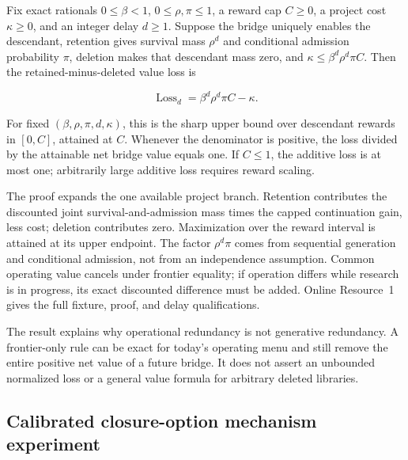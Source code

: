 \begin{theorem}
\label{thm:normalized-frontier-pruning-loss}
Fix exact rationals \(0\le\beta<1\), \(0\le\rho,\pi\le1\), a reward cap
\(C\ge0\), a project cost \(\kappa\ge0\), and an integer delay \(d\ge1\).
Suppose the bridge uniquely enables the descendant, retention gives survival
mass \(\rho^d\) and conditional admission probability \(\pi\), deletion makes
that descendant mass zero, and
\(\kappa\le\beta^d\rho^d\pi C\). Then the retained-minus-deleted value loss is

\begin{equation}
 \operatorname{Loss}_d
 =\beta^d\rho^d\pi C-\kappa.
 \label{eq:normalized-pruning-loss}
\end{equation}

For fixed \((\beta,\rho,\pi,d,\kappa)\), this is the sharp upper bound over
descendant rewards in \([0,C]\), attained at \(C\). Whenever the denominator
is positive, the loss divided by the attainable net bridge value equals one.
If \(C\le1\), the additive loss is at most one; arbitrarily large additive
loss requires reward scaling.
\end{theorem}

The proof expands the one available project branch. Retention contributes
the discounted joint survival-and-admission mass times the capped continuation
gain, less cost; deletion contributes zero. Maximization over the reward
interval is attained at its upper endpoint. The factor
\(\rho^d\pi\) comes from sequential generation and conditional admission, not
from an independence assumption. Common operating value cancels under
frontier equality; if operation differs while research is in progress, its
exact discounted difference must be added. Online Resource~1 gives the full
fixture, proof, and delay qualifications.

The result explains why operational redundancy is not generative redundancy.
A frontier-only rule can be exact for today's operating menu and still remove
the entire positive net value of a future bridge. It does not assert an
unbounded normalized loss or a general value formula for arbitrary deleted
libraries.

\subsection{Calibrated closure-option mechanism experiment}
\label{sec:closure-option-mechanism}

